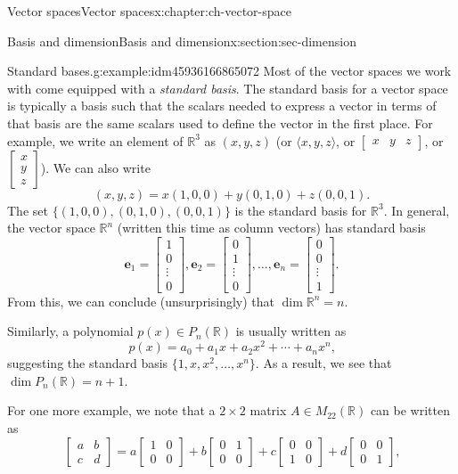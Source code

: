 \documentclass[oneside,10pt,]{book}
\numberwithin{equation}{section}
\newcommand{\bbm}{\begin{bmatrix}}
\newcommand{\ebm}{\end{bmatrix}}
\newcommand{\R}{\mathbb{R}}
\newcommand{\vece}{\mathbf{e}}
\newcommand{\amp}{&}
\begin{document}
\begin{chapterptx}{Vector spaces}{}{Vector spaces}{}{}{x:chapter:ch-vector-space}
\begin{sectionptx}{Basis and dimension}{}{Basis and dimension}{}{}{x:section:sec-dimension}
\begin{example}{Standard bases.}{g:example:idm45936166865072}
Most of the vector spaces we work with come equipped with a \emph{standard basis}. The standard basis for a vector space is typically a basis such that the scalars needed to express a vector in terms of that basis are the same scalars used to define the vector in the first place. For example, we write an element of \(\R^3\) as \((x,y,z)\) (or \(\langle x,y,z\rangle\), or \(\begin{bmatrix}x\amp y\amp z\end{bmatrix}\), or \(\begin{bmatrix}x\\y\\z\end{bmatrix}\)\textellipsis{}). We can also write%
\begin{equation*}
(x,y,z)=x(1,0,0)+y(0,1,0)+z(0,0,1)\text{.}
\end{equation*}
The set \(\{(1,0,0),(0,1,0),(0,0,1)\}\) is the standard basis for \(\R^3\). In general, the vector space \(\R^n\) (written this time as column vectors) has standard basis%
\begin{equation*}
\vece_1=\bbm 1\\0\\ \vdots \\0\ebm, \vece_2 = \bbm 0\\1\\ \vdots \\0\ebm, \ldots, \vece_n=\bbm 0\\0\\ \vdots \\1\ebm\text{.}
\end{equation*}
From this, we can conclude (unsurprisingly) that \(\dim \R^n = n\).%
\par
Similarly, a polynomial \(p(x)\in P_n(\R)\) is usually written as%
\begin{equation*}
p(x) = a_0+a_1x+a_2x^2+\cdots + a_nx^n\text{,}
\end{equation*}
suggesting the standard basis \(\{1,x,x^2,\ldots, x^n\}\). As a result, we see that \(\dim P_n(\R)=n+1\).%
\par
For one more example, we note that a \(2\times 2\) matrix \(A\in M_{22}(\R)\) can be written as%
\begin{equation*}
\bbm a\amp b\\c\amp d\ebm = a\bbm 1\amp 0\\0\amp 0\ebm+b\bbm 0\amp 1\\0\amp 0\ebm +c\bbm 0\amp 0\\1\amp 0\ebm + d\bbm 0\amp 0\\0\amp 1\ebm\text{,}

\end{equation*}
\end{example}
\end{sectionptx}
\end{chapterptx}
\end{document}
